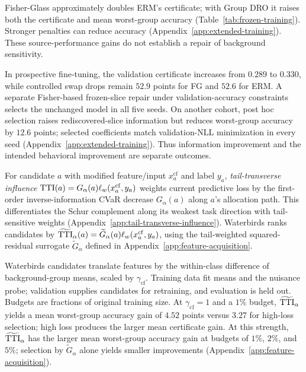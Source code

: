 Fisher-Glass approximately doubles ERM's certificate; with Group DRO it raises both the certificate and mean worst-group accuracy (Table~\ref{tab:frozen-training}). Stronger penalties can reduce accuracy (Appendix~\ref{app:extended-training}). These source-performance gains do not establish a repair of background sensitivity.

\FloatBarrier

In prospective fine-tuning, the validation certificate increases from $0.289$ to $0.330$, while controlled swap drops remain $52.9$ points for FG and $52.6$ for ERM. A separate Fisher-based frozen-slice repair under validation-accuracy constraints selects the unchanged model in all five seeds. On another cohort, post hoc selection raises rediscovered-slice information but reduces worst-group accuracy by $12.6$ points; selected coefficients match validation-NLL minimization in every seed (Appendix~\ref{app:extended-training}). Thus information improvement and the intended behavioral improvement are separate outcomes.

For candidate $a$ with modified feature/input $x_a^{\mathrm{cf}}$ and label $y_a$, \emph{tail-transverse influence} $\mathrm{TTI}(a)=G_\alpha(a)\ell_w(x_a^{\mathrm{cf}},y_a)$ weights current predictive loss by the first-order inverse-information CVaR decrease $G_\alpha(a)$ along $a$'s allocation path. This differentiates the Schur complement along its weakest task direction with tail-sensitive weights (Appendix~\ref{app:tail-transverse-influence}). Waterbirds ranks candidates by $\widetilde{\mathrm{TTI}}_\alpha(a)=\widetilde G_\alpha(a)\ell_w(x_a^{\mathrm{cf}},y_a)$, using the tail-weighted squared-residual surrogate $\widetilde G_\alpha$ defined in Appendix~\ref{app:feature-acquisition}.

Waterbirds candidates translate features by the within-class difference of background-group means, scaled by $\gamma_{\mathrm{cf}}$. Training data fit means and the nuisance probe; validation supplies candidates for retraining, and evaluation is held out. Budgets are fractions of original training size. At $\gamma_{\mathrm{cf}}=1$ and a $1\%$ budget, $\widetilde{\mathrm{TTI}}_\alpha$ yields a mean worst-group accuracy gain of $4.52$ points versus $3.27$ for high-loss selection; high loss produces the larger mean certificate gain. At this strength, $\widetilde{\mathrm{TTI}}_\alpha$ has the larger mean worst-group accuracy gain at budgets of $1\%$, $2\%$, and $5\%$; selection by $\widetilde G_\alpha$ alone yields smaller improvements (Appendix~\ref{app:feature-acquisition}).
